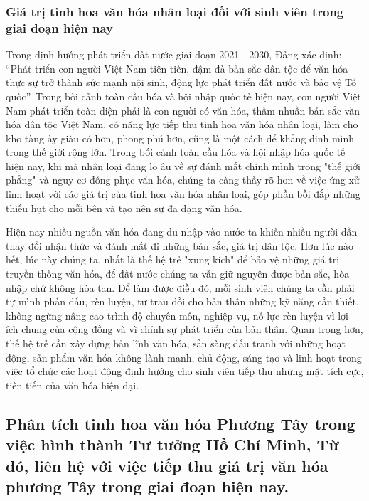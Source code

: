 \subsubsection{Giá trị tinh hoa văn hóa nhân loại đối với sinh viên trong giai đoạn hiện nay}

Trong định hướng phát triển đất nước giai đoạn 2021 - 2030, Đảng xác định: ``Phát triển con người Việt Nam tiên tiến, đậm đà bản sắc dân tộc để văn hóa thực sự trở thành sức mạnh nội sinh, động lực phát triển đất nước và bảo vệ Tổ quốc''. Trong bối cảnh toàn cầu hóa và hội nhập quốc tế hiện nay, con người Việt Nam phát triển toàn diện phải là con người có văn hóa, thấm nhuần bản sắc văn hóa dân tộc Việt Nam, có năng lực tiếp thu tinh hoa văn hóa nhân loại, làm cho kho tàng ấy giàu có hơn, phong phú hơn, cũng là một cách để khẳng định mình trong thế giới rộng lớn. Trong bối cảnh toàn cầu hóa và hội nhập hóa quốc tế hiện nay, khi mà nhân loại đang lo âu về sự đánh mất chính mình trong "thế giới phẳng" và nguy cơ đồng phục văn hóa, chúng ta càng thấy rõ hơn về việc ứng xử linh hoạt với các giá trị của tinh hoa văn hóa nhân loại, góp phần bồi đắp những thiếu hụt cho mỗi bên và tạo nên sự đa dạng văn hóa.

Hiện nay nhiều nguồn văn hóa đang du nhập vào nước ta khiến nhiều người dần thay đổi nhận thức và đánh mất đi những bản sắc, giá trị dân tộc. Hơn lúc nào hết, lúc này chúng ta, nhất là thế hệ trẻ "xung kích" để bảo vệ những giá trị truyền thống văn hóa, để đất nước chúng ta vẫn giữ nguyên được bản sắc, hòa nhập chứ không hòa tan. Để làm được điều đó, mỗi sinh viên chúng ta cần phải tự mình phấn đấu, rèn luyện, tự trau dồi cho bản thân những kỹ năng cần thiết, không ngừng nâng cao trình độ chuyên môn, nghiệp vụ, nỗ lực rèn luyện vì lợi ích chung của cộng đồng và vì chính sự phát triển của bản thân. Quan trọng hơn, thế hệ trẻ cần xây dựng bản lĩnh văn hóa, sẵn sàng đấu tranh với những hoạt động, sản phẩm văn hóa không lành mạnh, chủ động, sáng tạo và linh hoạt trong việc tổ chức các hoạt động định hướng cho sinh viên tiếp thu những mặt tích cực, tiên tiến của văn hóa hiện đại.

\cleardoublepage

\subsection{Phân tích tinh hoa văn hóa Phương Tây trong việc hình thành Tư tưởng Hồ Chí Minh, Từ đó, liên hệ với việc tiếp thu giá trị văn hóa phương Tây trong giai đoạn hiện nay.}


